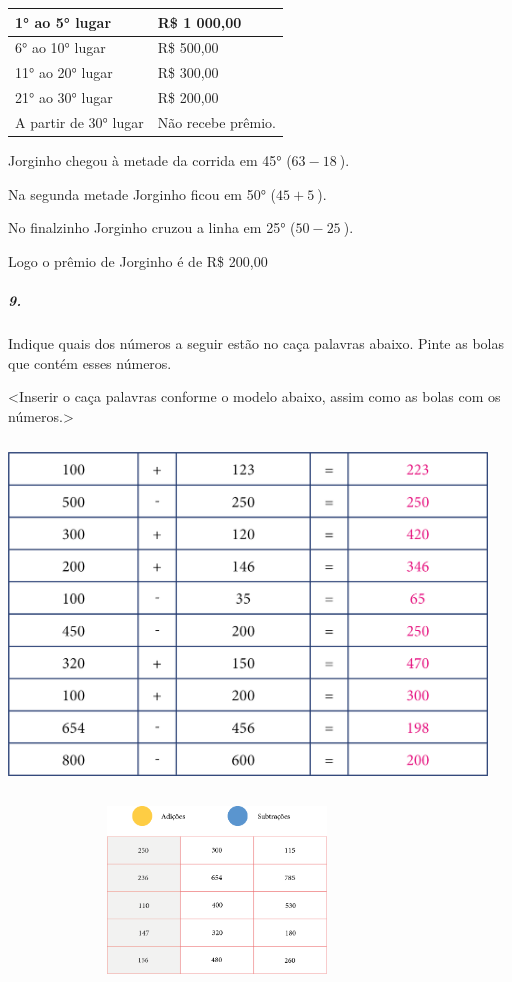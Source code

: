\begin{longtable}[]{@{}ll@{}}
\toprule
1° ao 5° lugar & R\$ 1 000,00\tabularnewline
\midrule
\endhead
6° ao 10° lugar & R\$ 500,00\tabularnewline
11° ao 20° lugar & R\$ 300,00\tabularnewline
21° ao 30° lugar & R\$ 200,00\tabularnewline
A partir de 30° lugar & Não recebe prêmio.\tabularnewline
\bottomrule
\end{longtable}

Jorginho chegou à metade da corrida em 45° (\(63 - 18\ \)).

Na segunda metade Jorginho ficou em 50° (\(45 + 5\ \)).

No finalzinho Jorginho cruzou a linha em 25° (\(50 - 25\ \)).

Logo o prêmio de Jorginho é de R\$ 200,00

\subparagraph{9. }\label{section-8}

Indique quais dos números a seguir estão no caça palavras abaixo. Pinte
as bolas que contém esses números.

\textless{}Inserir o caça palavras conforme o modelo abaixo, assim como
as bolas com os números.\textgreater{}

\includegraphics[width=5.00000in,height=3.61458in]{media/image19.png}

\includegraphics[width=4.35417in,height=1.75000in]{media/image20.png}

